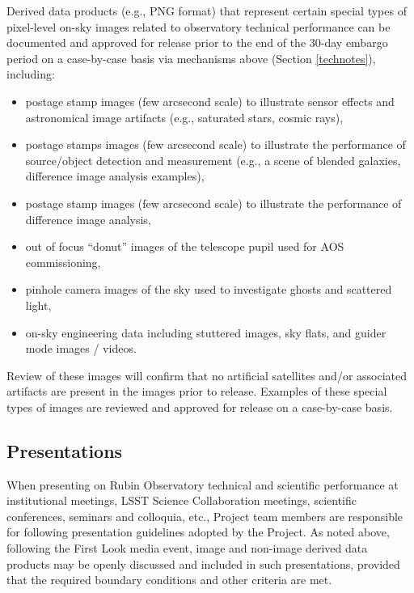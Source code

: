 \documentclass[SE,authoryear,toc]{lsstdoc}
\begin{document}
Derived data products (e.g., PNG format) that represent certain special types of pixel-level on-sky images related to observatory technical performance can be documented and approved for release prior to the end of the 30-day embargo period on a case-by-case basis via mechanisms above (Section \ref{technotes}), including:

\begin{itemize}

  \item postage stamp images (few arcsecond scale) to illustrate sensor effects and astronomical image artifacts (e.g., saturated stars, cosmic rays),

  \item postage stamps images (few arcsecond scale) to illustrate the performance of source/object detection and measurement (e.g., a scene of blended galaxies, difference image analysis examples),

  \item postage stamp images (few arcsecond scale) to illustrate the performance of difference image analysis,

  \item out of focus ``donut'' images of the telescope pupil used for AOS commissioning,

  \item pinhole camera images of the sky used to investigate ghosts and scattered light,

  \item on-sky engineering data including stuttered images, sky flats, and guider mode images / videos.

\end{itemize}

Review of these images will confirm that no artificial satellites and/or associated artifacts are present in the images prior to release.
Examples of these special types of images are reviewed and approved for release on a case-by-case basis.

\subsection{Presentations}

When presenting on Rubin Observatory technical and scientific performance at institutional meetings, LSST Science Collaboration meetings, scientific conferences, seminars and colloquia, etc., Project team members are responsible for following presentation guidelines adopted by the Project.
As noted above, following the First Look media event, image and non-image derived data products may be openly discussed and included in such presentations, provided that the required boundary conditions and other criteria are met.
\end{document}
